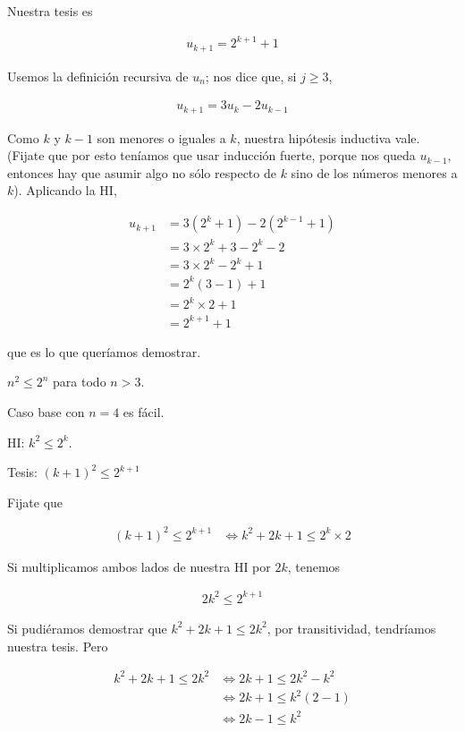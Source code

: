 \documentclass[a4paper, 12pt]{article}
\begin{document}
Nuestra tesis es 

\begin{align*}
    u_{k+1} = 2^{k+1} + 1
\end{align*}

Usemos la definición recursiva de $u_n$; nos dice que, si $j \geq 3$,

\begin{align*}
    u_{k+1} = 3u_k - 2u_{k-1}
\end{align*}

Como $k$ y $k-1$ son menores o iguales a $k$, nuestra hipótesis inductiva vale. 
(Fijate que por esto teníamos que usar inducción fuerte, porque nos queda 
$u_{k-1}$, entonces hay que asumir algo no sólo respecto de $k$ sino de 
los números menores a $k$). Aplicando la HI, 

\begin{align*}
    u_{k+1} &= 3\left( 2^{k} + 1 \right) - 2\left( 2^{k-1} + 1  \right) \\
            &=3\times 2^{k} + 3 - 2^k - 2 \\ 
            &=3\times 2^k - 2^k + 1 \\ 
            &=2^k(3 -1 ) + 1 \\ 
            &=2^k\times 2 + 1 \\ 
            &= 2^{k+1} + 1
\end{align*}

que es lo que queríamos demostrar.

\pagebreak 

$n^2 \leq 2^n$ para todo $n > 3$.

Caso base con $n = 4$ es fácil. 

HI: $k^2 \leq 2^k$. 

Tesis: $(k+1)^2 \leq 2^{k+1}$

Fijate que 

\begin{align*}
    (k+1)^2 \leq 2^{k+1} &\iff k^2 + 2k + 1 \leq 2^{k} \times 2
\end{align*}

Si multiplicamos ambos lados de nuestra HI por $2k$, tenemos 

\begin{align*}
    2k^2  \leq 2^{k+1}
\end{align*}

Si pudiéramos demostrar que $k^2 +2k + 1 \leq 2k^2$, por transitividad, tendríamos nuestra tesis.
Pero

\begin{align*}
    k^2 + 2k + 1 \leq 2k^2 &\iff 2k + 1 \leq 2k^2 - k^2 \\& \iff 2k+1 \leq k^2(2 - 1) \\&\iff 2k-1 \leq k^2
\end{align*}
\end{document}
